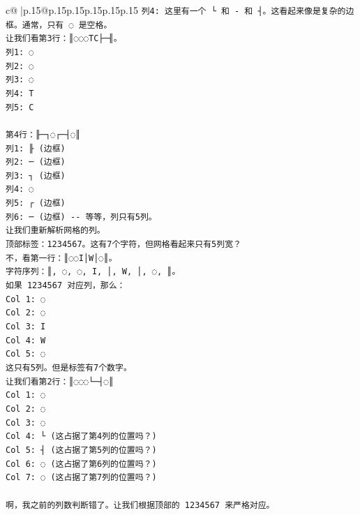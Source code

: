 \documentclass{article}
\begin{document}
{\begin{supertabular}{c@{$\;$}|p{.15\linewidth}@{}p{.15\linewidth}p{.15\linewidth}p{.15\linewidth}p{.15\linewidth}p{.15\linewidth}}
{{{\texttt{列4: 这里有一个 └ 和 {-} 和 ┤。这看起来像是复杂的边框。通常，只有 ◌ 是空格。} \\
\texttt{让我们看第3行：║◌◌◌TC├─╢。} \\
\texttt{列1: ◌} \\
\texttt{列2: ◌} \\
\texttt{列3: ◌} \\
\texttt{列4: T} \\
\texttt{列5: C} \\
\\ 
\texttt{第4行：╟─┐◌┌─┤◌║} \\
\texttt{列1: ╟ (边框)} \\
\texttt{列2: ─ (边框)} \\
\texttt{列3: ┐ (边框)} \\
\texttt{列4: ◌} \\
\texttt{列5: ┌ (边框)} \\
\texttt{列6: ─ (边框) {-}{-} 等等，列只有5列。} \\
\texttt{让我们重新解析网格的列。} \\
\texttt{顶部标签：1234567。这有7个字符，但网格看起来只有5列宽？} \\
\texttt{不，看第一行：║◌◌I│W│◌║。} \\
\texttt{字符序列：║, ◌, ◌, I, │, W, │, ◌, ║。} \\
\texttt{如果 1234567 对应列，那么：} \\
\texttt{Col 1: ◌} \\
\texttt{Col 2: ◌} \\
\texttt{Col 3: I} \\
\texttt{Col 4: W} \\
\texttt{Col 5: ◌} \\
\texttt{这只有5列。但是标签有7个数字。} \\
\texttt{让我们看第2行：║◌◌◌└─┤◌║} \\
\texttt{Col 1: ◌} \\
\texttt{Col 2: ◌} \\
\texttt{Col 3: ◌} \\
\texttt{Col 4: └ (这占据了第4列的位置吗？)} \\
\texttt{Col 5: ┤ (这占据了第5列的位置吗？)} \\
\texttt{Col 6: ◌ (这占据了第6列的位置吗？)} \\
\texttt{Col 7: ◌ (这占据了第7列的位置吗？)} \\
\\ 
\texttt{啊，我之前的列数判断错了。让我们根据顶部的 1234567 来严格对应。} \\
}}}
\end{supertabular}}
\end{document}
